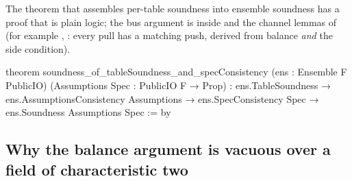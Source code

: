 
The theorem that assembles per-table soundness into ensemble soundness has a proof that is plain
logic; the bus argument is inside  and the channel lemmas of
 (for example , : every pull has a
matching push, derived from balance \emph{and} the side condition).

\begin{leancode}
theorem soundness_of_tableSoundness_and_specConsistency (ens : Ensemble F PublicIO)
  (Assumptions Spec : PublicIO F → Prop) :
  ens.TableSoundness →
  ens.AssumptionsConsistency Assumptions →
  ens.SpecConsistency Spec →
    ens.Soundness Assumptions Spec := by
\end{leancode}


\subsection{Why the balance argument is vacuous over a field of characteristic two}\label{sec:gen-lib-clean-vacuous}

